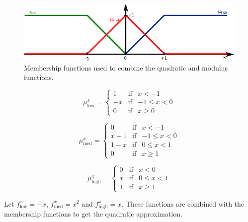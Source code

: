 \begin{figure}[h!]
	\centering
	\includegraphics[width=0.7\linewidth]{modulus/images/fuzzy}
	\caption[Membership functions for the quadratic approx. of the \textit{modulus}]{Membership functions used to combine the quadratic and modulus functions.}
	\label{fig:fuzzy}
\end{figure}

\begin{equation}
\label{eq:mulow}
\mu^x_{\text{low}}= \left\{ \begin{array}{lcc}
1 &   \text{if}  & x < -1 \\
-x & \text{if}  & -1 \leq x < 0 \\
0 &  \text{if} & x \geq 0
\end{array}
\right.
\end{equation}

\begin{equation}
\label{eq:mumid}
\mu^x_{\text{med}}= \left\{ \begin{array}{lcc}
0 &   \text{if}  & x < -1 \\
x+1 & \text{if}  & -1 \leq x < 0 \\
1-x & \text{if}  & 0 \leq x < 1 \\
0 &  \text{if} & x \geq 1
\end{array}
\right.
\end{equation}

\begin{equation}
\label{eq:muhigh}
\mu^x_{\text{high}}= \left\{ \begin{array}{lcc}
0 &   \text{if}  & x < 0 \\
x & \text{if}  & 0 \leq x < 1 \\
1 &  \text{if} & x \geq 1
\end{array}
\right.
\end{equation}

Let $f^x_{\text{low}}=-x$, $f^x_{\text{med}}=x^2$ and $f^x_{\text{high}}=x$. These functions are combined with the membership functions to get the quadratic approximation.

